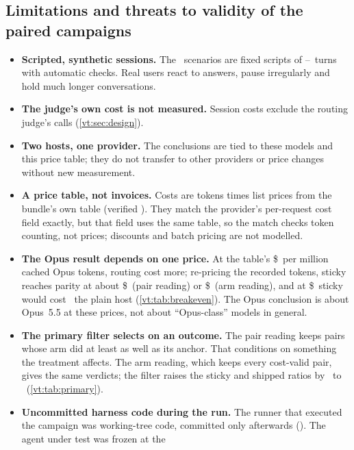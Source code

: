 \subsection{Limitations and threats to validity of the paired campaigns}\label{vt:sec:limits}

\begin{itemize}
  \item \textbf{Scripted, synthetic sessions.} The \NScenarios\ scenarios are fixed scripts of
    \MinTurns--\MaxTurns\ turns with automatic checks. Real users react to answers, pause irregularly and
    hold much longer conversations.
  \item \textbf{The judge's own cost is not measured.} Session costs exclude the routing judge's calls
    (\cref{vt:sec:design}).
  \item \textbf{Two hosts, one provider.} The conclusions are tied to these models and this price table;
    they do not transfer to other providers or price changes without new measurement.
  \item \textbf{A price table, not invoices.} Costs are tokens times list prices from the bundle's own table
    (verified \RatesVerified). They match the provider's per-request cost field exactly, but that field uses
    the same table, so the match checks token counting, not prices; discounts and batch pricing are not
    modelled.
  \item \textbf{The Opus result depends on one price.} At the table's \$\PriceOpusRead\ per million cached
    Opus tokens, routing cost more; re-pricing the recorded tokens, sticky reaches parity at about
    \$\BEStickyPair\ (pair reading) or \$\BEStickyArm\ (arm reading), and at \$\RateForty\ sticky would cost
    \BEStickyForty\X\ the plain host (\cref{vt:tab:breakeven}). The Opus conclusion is about Opus~5.5 at these
    prices, not about ``Opus-class'' models in general.
  \item \textbf{The primary filter selects on an outcome.} The pair reading keeps pairs whose arm did at
    least as well as its anchor. That conditions on something the treatment affects. The arm reading, which
    keeps every cost-valid pair, gives the same verdicts; the filter raises the sticky and shipped ratios by
    \FilterLiftLow\ to \FilterLiftHigh\ (\cref{vt:tab:primary}).
  \item \textbf{Uncommitted harness code during the run.} The runner that executed the campaign was
    working-tree code, committed only afterwards (\code{\HarnessSha}). The agent under test was frozen at the

\end{itemize}
